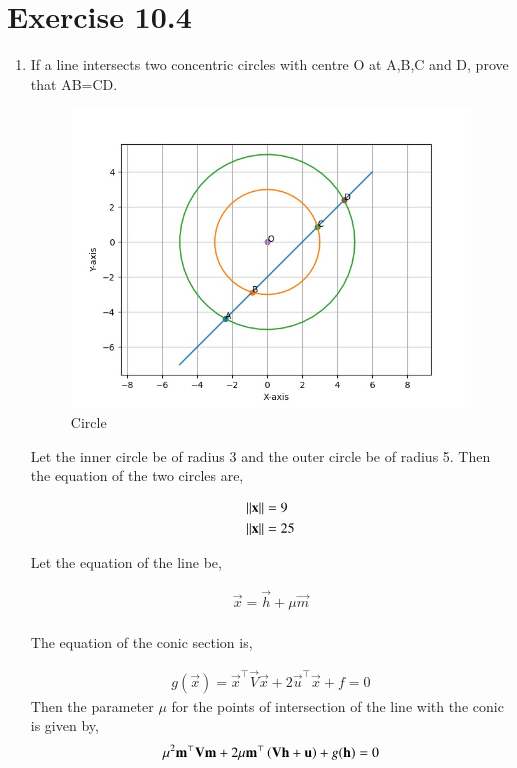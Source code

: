 \documentclass[journal,12pt,twocolumn]{IEEEtran}
\begin{document}
\section{Exercise 10.4}
\begin{enumerate}
	\item If a line intersects two concentric circles with centre O at A,B,C and D, prove that AB=CD.

\begin{figure}[ht]
	\centering
	\includegraphics[width = \columnwidth]{figs/plot.jpg}
	\caption{Circle}
	\label{fig:1}
\end{figure}

Let the inner circle be of radius 3 and the outer circle be of radius 5. Then the equation of the two circles are,

		\begin{align}
			\left\lVert\mathbf{x}\right\rVert &= 9\\
			\left\lVert\mathbf{x}\right\rVert &= 25
		\end{align}

Let the equation of the line be,

		\begin{align}
			\vec{x} = \vec{h} +\mu \vec{m}\\
		\end{align}

The equation of the conic section is,

		\begin{align}
			g(\vec{x}) = \vec{x}^{\top}\vec{V}\vec{x} +2\vec{u}^{\top}\vec{x} + f=0
		\end{align}
Then the parameter $\mu$ for the points of intersection of the line with the conic is given by,
		\begin{align}
			\mu^2\mathbf{m}^{\top}\mathbf{V}\mathbf{m}+2\mu\mathbf{m}^{\top}\left(\mathbf{V}\mathbf{h}+\mathbf{u}\right) +g(\mathbf{h}) = 0
		\end{align}


\end{enumerate}
\end{document}

